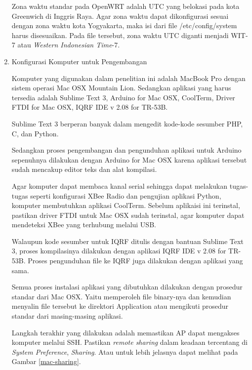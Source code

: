\begin{enumerate}
					Zona waktu standar pada OpenWRT adalah UTC yang belokasi pada kota Greenwich di Inggris Raya. Agar zona waktu dapat dikonfigurasi sesuai dengan zona waktu kota Yogyakarta, maka isi dari file /etc/config/system harus disesuaikan. Pada file tersebut, zona waktu UTC diganti menjadi WIT-7 atau \emph{Western Indonesian Time}-7.

				\item Konfigurasi Komputer untuk Pengembangan

					Komputer yang digunakan dalam penelitian ini adalah MacBook Pro dengan sistem operasi Mac OSX Mountain Lion. Sedangkan aplikasi yang harus tersedia adalah Sublime Text 3, Arduino for Mac OSX, CoolTerm, Driver FTDI for Mac OSX, IQRF IDE v 2.08 for TR-53B.

					Sublime Text 3 berperan banyak dalam mengedit kode-kode sesumber PHP, C, dan Python.

					Sedangkan proses pengembangan dan pengunduhan aplikasi untuk Arduino sepenuhnya dilakukan dengan Arduino for Mac OSX karena aplikasi tersebut sudah mencakup editor teks dan alat kompilasi.

					Agar komputer dapat membaca kanal serial sehingga dapat melakukan tugas-tugas seperti konfigurasi XBee Radio dan pengujian aplikasi Python, komputer membutuhkan aplikasi CoolTerm. Sebelum aplikaisi ini terinstal, pastikan driver FTDI untuk Mac OSX sudah terinstal, agar komputer dapat mendeteksi XBee yang terhubung melalui USB.

					Walaupun kode sesumber untuk IQRF ditulis dengan bantuan Sublime Text 3, proses kompilasinya dilakukan dengan aplikasi IQRF IDE v 2.08 for TR-53B. Proses pengunduhan file ke IQRF juga dilakukan dengan aplikasi yang sama.

					Semua proses instalasi aplikasi yang dibutuhkan dilakukan dengan prosedur standar dari Mac OSX. Yaitu memperoleh file binary-nya dan kemudian menyalin file tersebut ke direktori Application atau mengikuti prosedur standar dari masing-masing aplikasi.

					Langkah terakhir yang dilakukan adalah memastikan AP dapat mengakses komputer melalui SSH. Pastikan \emph{remote sharing} dalam keadaan tercentang di \emph{System Preference}, \emph{Sharing}. Atau untuk lebih jelasnya dapat melihat pada Gambar \ref{mac-sharing}.


\end{enumerate}
